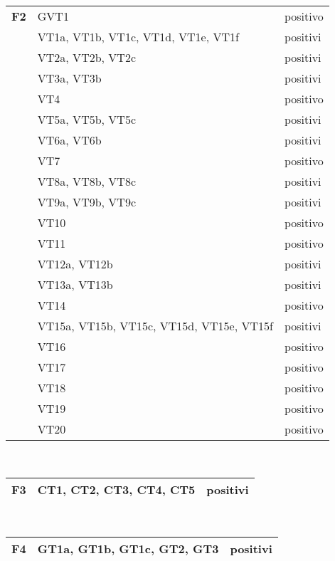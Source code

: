  \begin{center}
\begin{tabular}{|p{2cm}|p{7cm}|p{2cm}|} \hline
\textbf{F2}  & GVT1 & positivo\\ \cline{2-3}
&  VT1a, VT1b, VT1c, VT1d, VT1e, VT1f & positivi\\ \cline{2-3}
&  VT2a, VT2b, VT2c & positivi\\ \cline{2-3}
&  VT3a, VT3b & positivi\\ \cline{2-3}
&  VT4 & positivo\\ \cline{2-3}
&  VT5a, VT5b, VT5c & positivi\\ \cline{2-3}
&  VT6a, VT6b & positivi\\ \cline{2-3}
&  VT7 & positivo\\ \cline{2-3}
&  VT8a, VT8b, VT8c & positivi\\ \cline{2-3}
&  VT9a, VT9b, VT9c & positivi\\ \cline{2-3}
&  VT10 & positivo\\ \cline{2-3}
&  VT11 & positivo\\ \cline{2-3}
&  VT12a, VT12b & positivi\\ \cline{2-3}
&  VT13a, VT13b & positivi\\ \cline{2-3}
&  VT14 & positivo\\ \cline{2-3}
&  VT15a, VT15b, VT15c, VT15d, VT15e, VT15f & positivi\\ \cline{2-3}
&  VT16 & positivo\\ \cline{2-3}
&  VT17 & positivo\\ \cline{2-3}
&  VT18 & positivo\\ \cline{2-3}
&  VT19 & positivo\\ \cline{2-3}
&  VT20 & positivo\\ \hline
\end{tabular} \\
\end{center}

 \begin{center}
\begin{tabular}{|p{2cm}|p{7cm}|p{2cm}|} \hline
\textbf{F3 } & CT1, CT2, CT3, CT4, CT5 & positivi \\ \hline
\end{tabular} \\
\end{center}

 \begin{center}
\begin{tabular}{|p{2cm}|p{7cm}|p{2cm}|} \hline
\textbf{F4}  & GT1a, GT1b, GT1c, GT2, GT3 & positivi\\ \hline
\end{tabular} \\
\end{center}

